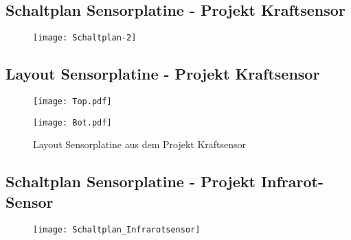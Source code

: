 \documentclass[
	letterpaper, %
	10pt, %
]{CSUniSchoolLabReport}
\begin{document}
\begin{spacing}{1.6}
\begin{landscape}
    \subsection{Schaltplan Sensorplatine - Projekt \glqq Kraftsensor\grqq} \label{subsec:Schaltplan_Kraftsensor}
    \begin{figure}[H]
        \centering
        \texttt{[image: Schaltplan-2]}
        \label{fig:placeholder}
    \end{figure}
        
\end{landscape}

\subsection{Layout Sensorplatine - Projekt \glqq Kraftsensor\grqq} \label{subsec:Layout_Kraftsensor}

\begin{figure}[H]
\begin{minipage}[t]{0.5\textwidth}
    \centering
    \texttt{[image: Top.pdf]}
\end{minipage}
\begin{minipage}[t]{0.5\textwidth}
    \centering
    \texttt{[image: Bot.pdf]}
\end{minipage}
    \caption{Layout Sensorplatine aus dem Projekt \glqq Kraftsensor\grqq}
    \label{fig:placeholder}
\end{figure}

\begin{landscape}
    \subsection{Schaltplan Sensorplatine - Projekt \glqq Infrarot-Sensor\grqq} \label{subsec:Schaltplan_Infrarotsensor}
    \begin{figure}[H]
        \centering
        \texttt{[image: Schaltplan\_Infrarotsensor]}
        \label{fig:placeholder}
    \end{figure}
\end{landscape}


\end{spacing}
\end{document}
